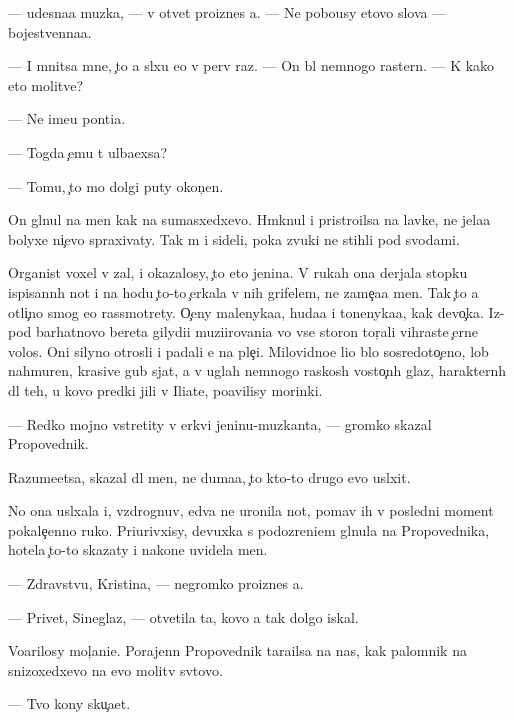 \documentclass[10pt]{book}
\begin{document}
— {\C}udesna{\y}a muz{\yi}ka, — v otvet pro{\y}iznes {\y}a. — Ne pobo{\y}usy etovo slova — bojestvenna{\y}a.

— I mnitsa mne, {\c}to {\y}a sl{\yi}xu {\y}e{\y}o v perv{\yi}{\y} raz. — On b{\yi}l nemnogo raster{\ia}n. — K kako{\y} eto molitve?

— Ne ime{\y}u pon{\ia}ti{\y}a.

— Togda {\c}emu t{\yi} ul{\yi}ba{\y}exsa?

— Tomu, {\c}to mo{\y} dolgi{\y} puty okon{\c}en.

On gl{\ia}nul na men{\ia} kak na sumasxedxevo. Hm{\yi}knul i pristro{\y}ilsa na lavke, ne jela{\y}a bolyxe ni{\c}evo spraxivaty. Tak m{\yi} i sideli, poka zvuki ne stihli pod svodami.

Organist voxel v zal, i okazalosy, {\c}to eto jen{\x}ina. V rukah ona derjala stopku ispisann{\yi}h not i na hodu {\c}to-to {\c}erkala v nih grifelem, ne zame{\c}a{\y}a men{\ia}. Tak {\c}to {\y}a otli{\c}no smog {\y}e{\y}o rassmotrety. O{\c}eny malenyka{\y}a, huda{\y}a i tonenyka{\y}a, kak devo{\c}ka. Iz-pod barhatnovo bereta gilydi{\y}i muzi{\q}irovani{\y}a vo vse storon{\yi} tor{\c}ali vihrast{\yi}{\y}e {\c}ern{\yi}{\y}e volos{\yi}. Oni silyno otrosli i padali {\y}e{\y} na ple{\c}i. Milovidno{\y}e li{\q}o b{\yi}lo sosredoto{\c}eno, lob nahmuren, krasiv{\yi}{\y}e gub{\yi} sjat{\yi}, a v uglah nemnogo raskos{\yi}h vosto{\c}n{\yi}h glaz, haraktern{\yi}h dl{\ia} teh, u kovo predki jili v Iliate, po{\y}avilisy mor{\x}inki.

— Redko mojno vstretity v {\q}erkvi jen{\x}inu-muz{\yi}kanta, — gromko skazal Propovednik.

Razume{\y}etsa, skazal dl{\ia} men{\ia}, ne duma{\y}a, {\c}to kto-to drugo{\y} {\y}evo usl{\yi}xit.

No ona usl{\yi}xala i, vzdrognuv, {\y}edva ne uronila not{\yi}, po{\y}mav ih v posledni{\y} moment pokale{\c}enno{\y} ruko{\y}. Pri{\x}urivxisy, devuxka s podozreni{\y}em gl{\ia}nula na Propovednika, hotela {\c}to-to skazaty i nakone{\q} uvidela men{\ia}.

— Zdravstvu{\y}, Kristina, — negromko pro{\y}iznes {\y}a.

— Privet, Sineglaz{\yi}{\y}, — otvetila ta, kovo {\y}a tak dolgo iskal.

Vo{\q}arilosy mol{\c}ani{\y}e. Porajenn{\yi}{\y} Propovednik tara{\x}ilsa na nas, kak palomnik na snizoxedxevo na {\y}evo molitv{\yi} sv{\ia}tovo.

— Tvo{\y} kony sku{\c}a{\y}et.
\end{document}
